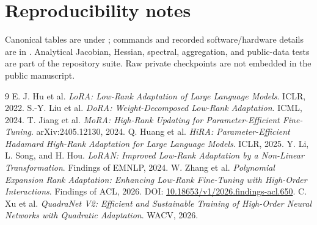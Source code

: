 \documentclass[11pt]{article}
\begin{document}
\section{Reproducibility notes}
Canonical tables are under ; commands and recorded software/hardware details are in . Analytical Jacobian, Hessian, spectral, aggregation, and public-data tests are part of the repository suite. Raw private checkpoints are not embedded in the public manuscript.

\begin{thebibliography}{9}
 E. J. Hu et al. \emph{LoRA: Low-Rank Adaptation of Large Language Models}. ICLR, 2022.
 S.-Y. Liu et al. \emph{DoRA: Weight-Decomposed Low-Rank Adaptation}. ICML, 2024.
 T. Jiang et al. \emph{MoRA: High-Rank Updating for Parameter-Efficient Fine-Tuning}. arXiv:2405.12130, 2024.
 Q. Huang et al. \emph{HiRA: Parameter-Efficient Hadamard High-Rank Adaptation for Large Language Models}. ICLR, 2025.
 Y. Li, L. Song, and H. Hou. \emph{LoRAN: Improved Low-Rank Adaptation by a Non-Linear Transformation}. Findings of EMNLP, 2024.
 W. Zhang et al. \emph{Polynomial Expansion Rank Adaptation: Enhancing Low-Rank Fine-Tuning with High-Order Interactions}. Findings of ACL, 2026. DOI: \href{https://doi.org/10.18653/v1/2026.findings-acl.650}{10.18653/v1/2026.findings-acl.650}.
 C. Xu et al. \emph{QuadraNet V2: Efficient and Sustainable Training of High-Order Neural Networks with Quadratic Adaptation}. WACV, 2026.
\end{thebibliography}
\end{document}
